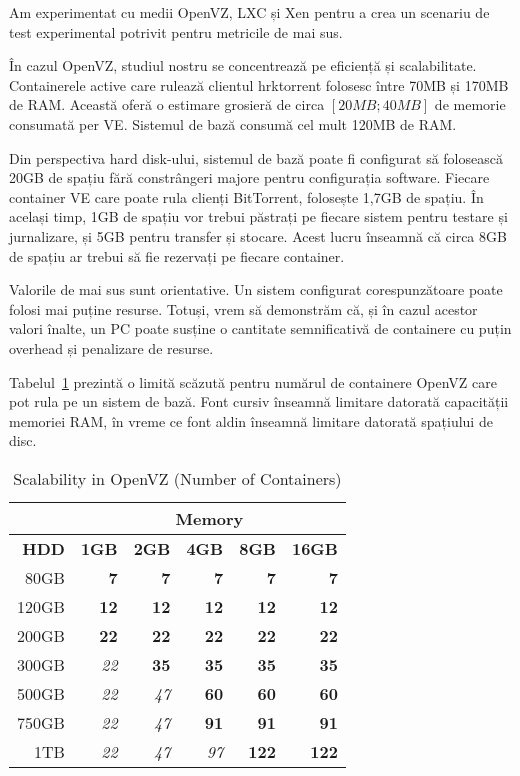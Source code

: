 Am experimentat cu medii OpenVZ, LXC și Xen pentru a crea un scenariu de test
experimental potrivit pentru metricile de mai sus.

În cazul OpenVZ, studiul nostru se concentrează pe eficiență și scalabilitate.
Containerele active care rulează clientul hrktorrent folosesc între 70MB și
170MB de RAM. Această oferă o estimare grosieră de circa $[20MB; 40MB]$ de
memorie consumată per VE. Sistemul de bază consumă cel mult 120MB de RAM.

Din perspectiva hard disk-ului, sistemul de bază poate fi configurat să
folosească 20GB de spațiu fără constrângeri majore pentru configurația
software. Fiecare container VE care poate rula clienți BitTorrent, folosește
1,7GB de spațiu. În același timp, 1GB de spațiu vor trebui păstrați pe fiecare
sistem pentru testare și jurnalizare, și 5GB pentru transfer și stocare. Acest
lucru înseamnă că circa 8GB de spațiu ar trebui să fie rezervați pe fiecare
container.

Valorile de mai sus sunt orientative. Un sistem configurat corespunzătoare
poate folosi mai puține resurse. Totuși, vrem să demonstrăm că, și în cazul
acestor valori înalte, un PC poate susține o cantitate semnificativă de
containere cu puțin overhead și penalizare de resurse.

Tabelul~\ref{table:virt-infra:openvz} prezintă o limită scăzută pentru numărul
de containere OpenVZ care pot rula pe un sistem de bază. Font cursiv înseamnă
limitare datorată capacității memoriei RAM, în vreme ce font aldin înseamnă
limitare datorată spațiului de disc.

\begin{table}[ht]
  \centering
  \begin{tabular}{|r|r|r|r|r|r|}
    \hline
     & \multicolumn{5}{|c|}{\textbf{Memory}} \\
    \hline
    \textbf{HDD} & \textbf{1GB} & \textbf{2GB} & \textbf{4GB} & \textbf{8GB} &
    \textbf{16GB} \\
    \hline
    80GB & \textbf{7} & \textbf{7} & \textbf{7} & \textbf{7} &
    \textbf{7} \\
    \hline
    120GB & \textbf{12} & \textbf{12} & \textbf{12} & \textbf{12} &
    \textbf{12} \\
    \hline
    200GB & \textbf{22} & \textbf{22} & \textbf{22} & \textbf{22} &
    \textbf{22} \\
    \hline
    300GB & \textit{22} & \textbf{35} & \textbf{35} & \textbf{35} &
    \textbf{35} \\
    \hline
    500GB & \textit{22} & \textit{47} & \textbf{60} & \textbf{60} &
    \textbf{60} \\
    \hline
    750GB & \textit{22} & \textit{47} & \textbf{91} & \textbf{91} &
    \textbf{91} \\
    \hline
    1TB & \textit{22} & \textit{47} & \textit{97} & \textbf{122} &
    \textbf{122} \\
    \hline
  \end{tabular}
  \caption{Scalability in OpenVZ (Number of Containers)}
  \label{table:virt-infra:openvz}
\end{table}


